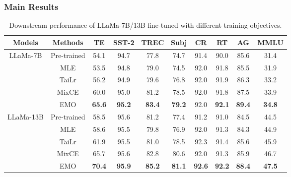 \subsubsection{Main Results}
\begin{table}[h!]
    \centering
    \footnotesize
        \caption{Downstream performance of LLaMa-7B/13B  fine-tuned with different training objectives.}
    \begin{tabular}{cc|cccccccc}
        \toprule
        \textbf{Models}             & \textbf{Methods} & \textbf{TE} & \textbf{SST-2} & \textbf{TREC} & \textbf{Subj} & \textbf{CR} & \textbf{RT} & \textbf{AG} & \textbf{MMLU} \\
        \midrule
        \multirow{5}{*}{LLaMa-7B} & Pre-trained      & 54.1                    & 94.7           & 77.8          & 74.7          & 91.4        & 90.0                     & 85.6              & 31.4 \\
                                    & MLE              & 53.5                    & 94.8           & 79.0          & 74.5          & 92.0        & 91.8                     & 85.5              & 31.9 \\
                                    & TaiLr            & 56.2                    & 94.9           & 79.6          & 76.8          & 92.0        & 91.9                     &86.3              & 33.2 \\
                                    & MixCE            & 60.0                    & 95.0           & 81.2          & 78.5          & 92.0        & 91.8                     & 87.5              & 33.9 \\
                                    & EMO           & \textbf{65.6}           & \textbf{95.2}           & \textbf{83.4}          & \textbf{79.2}          & 92.0        & \textbf{92.1}                     &\textbf{89.4}              & \textbf{34.8} \\
        \midrule
        \multirow{5}{*}{LLaMa-13B} & Pre-trained      &  58.5                   & 95.6           & 81.2          & 77.4          & 91.2        &  91.0                    &  84.5             &44.5  \\
                                    & MLE              & 58.6                    &95.5           & 79.8          &76.9           & 92.0        &  91.3                    &  84.3             &44.9  \\
                                    & TaiLr            & 61.9                    &95.5            & 81.0          &78.5           & 92.3        & 91.4                     & 85.6              &45.9  \\
                                    & MixCE            & 65.7                    &95.6            & 82.8          &80.6           &92.0         & 91.3                     & 85.9              &46.7  \\
                                    & EMO           & \textbf{70.4}           & \textbf{95.9}           &\textbf{85.2}     &\textbf{81.1}           &\textbf{92.6}         &\textbf{92.2}          &\textbf{88.4}               &\textbf{47.5}  \\
        \bottomrule
        \end{tabular}
        \label{table:nlu}
\end{table}
